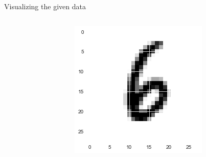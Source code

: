 \documentclass[12pt,t]{beamer}
\begin{document}
\begin{frame}[t]{Visualizing the given data}
\begin{columns}
\begin{column}[]{0.3\linewidth}
        \end{column}
        \begin{column}[]{0.3\linewidth}
            \includegraphics[width=\linewidth]{visualize_data/fig_6.png}
        \end{column}
    \end{columns}

\end{frame}
\end{document}
